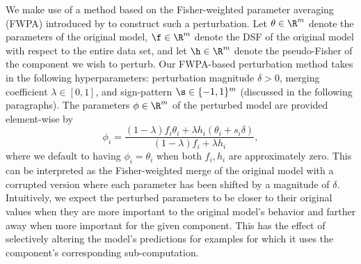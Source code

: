 \documentclass[dvipsnames]{article}
\begin{document}

We make use of a method based on the Fisher-weighted parameter averaging (FWPA) introduced by \citet{matena2021merging} to construct such a perturbation. %
Let $\theta \in \R^m$ denote the parameters of the original model, $\f \in \R^m$ denote the DSF of the original model with respect to the entire data set, and let $\h\in\R^m$ denote the pseudo-Fisher of the component we wish to perturb.
Our FWPA-based perturbation method takes in the following hyperparameters: perturbation magnitude $\delta > 0$, merging coefficient $\lambda \in [0, 1]$, and sign-pattern $\s \in \{-1,1\}^m$ (discussed in the following paragraphs).
The parameters $\phi\in\R^m$ of the perturbed model are provided element-wise by
\begin{equation}\label{eq:fwpa_perturb}
    \phi_i = \frac{(1 - \lambda) f_i \theta_i + \lambda h_i(\theta_i + s_i \delta)}{(1 - \lambda) f_i + \lambda h_i},
\end{equation}
where we default to having $\phi_i = \theta_i$ when both $f_i,h_i$ are approximately zero.
This can be interpreted as the Fisher-weighted merge of the original model with a corrupted version where each parameter has been shifted by a magnitude of $\delta$.
Intuitively, we expect the perturbed parameters to be closer to their original values when they are more important to the original model's behavior and farther away when more important for the given component.
This has the effect of selectively altering the model's predictions for examples for which it uses the component's corresponding sub-computation.
\end{document}
